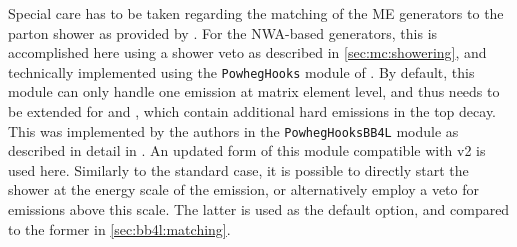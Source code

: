 Special care has to be taken regarding the matching of the \powheg ME generators to the parton shower as provided by \pythia.  %
For the NWA-based generators, this is accomplished here using a shower veto as described in \cref{sec:mc:showering}, and technically implemented using the \texttt{PowhegHooks} module of \pythia. By default, this module can only handle one emission at matrix element level, and thus needs to be extended for \bbfourl and \ttb, which contain additional hard emissions in the top decay. This was implemented by the \bbfourl authors in the \texttt{PowhegHooksBB4L} module as described in detail in . An updated form of this module compatible with \bbfourl v2 is used here. Similarly to the standard \ttbar case, it is possible to directly start the shower at the energy scale of the \powheg emission, or alternatively employ a veto for emissions above this scale. The latter is used as the default option, and compared to the former in \cref{sec:bb4l:matching}.




